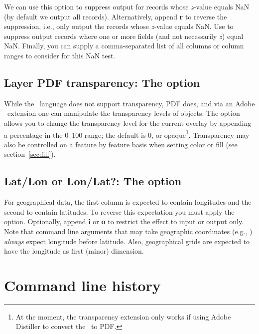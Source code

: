 We can use this option to suppress output for records whose {\it z}-value equals NaN
(by default we output all records).  Alternatively, append {\bf r} to reverse the suppression,
i.e., only output the records whose {\it z}-value equals NaN.  Use  to suppress
output records where one or more fields (and not necessarily {\it z}) equal NaN.  Finally, you can supply
a comma-separated list of all columns or column ranges to consider for this NaN test.

\subsection{Layer PDF transparency: The  option}
\label{sec:ltransp}

While the \PS\ language does not support transparency, PDF does, and via an Adobe \PS\ extension
one can manipulate the transparency levels of objects.  The  option allows you to change
the transparency level for the current overlay by appending a percentage in the 0--100 range; the
default is 0, or opaque\footnote{At the moment, the transparency extension only works if
using Adobe Distiller to convert the \PS\ to PDF.}.  Transparency may also be controlled
on a feature by feature basis when setting color or fill (see section~\ref{sec:fill}).

\subsection{Lat/Lon or Lon/Lat?: The \Opt{:} option}

For geographical data, the first column is expected to contain longitudes
and the second to contain latitudes.  To reverse this expectation you must
apply the \Opt{:} option.  Optionally, append \textbf{i} or \textbf{o} to restrict
the effect to input or output only.  Note that command line arguments that may take
geographic coordinates (e.g., ) \emph{always} expect longitude before
latitude. Also, geographical grids are expected to have the longitude as
first (minor) dimension.

%

\section{Command line history}
\label{sec:gmtcommands}


